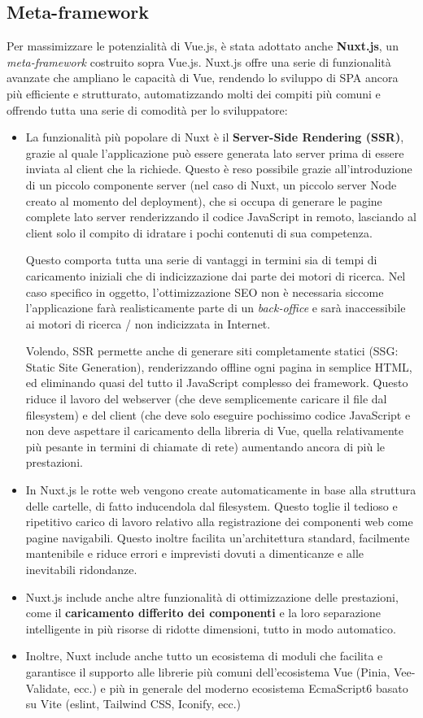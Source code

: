 \subsection{Meta-framework}
Per massimizzare le potenzialità di Vue.js, è stata adottato anche \textbf{Nuxt.js}, un \emph{meta-framework} costruito sopra Vue.js. Nuxt.js offre una serie di funzionalità avanzate che ampliano le capacità di Vue, rendendo lo sviluppo di SPA ancora più efficiente e strutturato, automatizzando molti dei compiti più comuni e offrendo tutta una serie di comodità per lo sviluppatore:
\begin{itemize}
    \item La funzionalità più popolare di Nuxt è il \textbf{Server-Side Rendering (SSR)}, grazie al quale l'applicazione può essere generata lato server prima di essere inviata al client che la richiede. Questo è reso possibile grazie all'introduzione di un piccolo componente server (nel caso di Nuxt, un piccolo server Node creato al momento del deployment), che si occupa di generare le pagine complete lato server renderizzando il codice JavaScript in remoto, lasciando al client solo il compito di idratare i pochi contenuti di sua competenza.
    
    Questo comporta tutta una serie di vantaggi in termini sia di tempi di caricamento iniziali che di indicizzazione dai parte dei motori di ricerca. Nel caso specifico in oggetto, l'ottimizzazione SEO non è necessaria siccome l'applicazione farà realisticamente parte di un \emph{back-office} e sarà inaccessibile ai motori di ricerca / non indicizzata in Internet.

    Volendo, SSR permette anche di generare siti completamente statici (SSG: Static Site Generation), renderizzando offline ogni pagina in semplice HTML, ed eliminando quasi del tutto il JavaScript complesso dei framework. Questo riduce il lavoro del webserver (che deve semplicemente caricare il file dal filesystem) e del client (che deve solo eseguire pochissimo codice JavaScript e non deve aspettare il caricamento della libreria di Vue, quella relativamente più pesante in termini di chiamate di rete) aumentando ancora di più le prestazioni.
    \item In Nuxt.js le rotte web vengono create automaticamente in base alla struttura delle cartelle, di fatto inducendola dal filesystem. Questo toglie il tedioso e ripetitivo carico di lavoro relativo alla registrazione dei componenti web come pagine navigabili. Questo inoltre facilita un'architettura standard, facilmente mantenibile e riduce errori e imprevisti dovuti a dimenticanze e alle inevitabili ridondanze.
    \item Nuxt.js include anche altre funzionalità di ottimizzazione delle prestazioni, come il \textbf{caricamento differito dei componenti} e la loro separazione intelligente in più risorse di ridotte dimensioni, tutto in modo automatico.
    \item Inoltre, Nuxt include anche tutto un ecosistema di moduli che facilita e garantisce il supporto alle librerie più comuni dell'ecosistema Vue (Pinia, Vee-Validate, ecc.) e più in generale del moderno ecosistema EcmaScript6 basato su Vite (eslint, Tailwind CSS, Iconify, ecc.)
\end{itemize}

